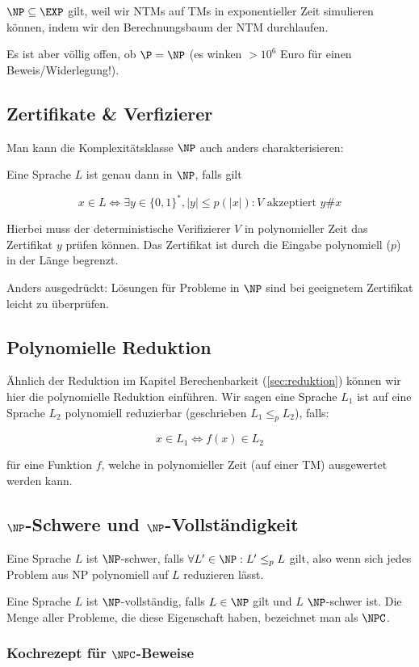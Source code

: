 \documentclass[a4paper,parskip=half*,DIV=7,fontsize=11pt]{scrartcl}
\begin{document}
$\NP \subseteq \EXP$ gilt, weil wir NTMs auf TMs in exponentieller Zeit simulieren können, indem wir den Berechnungsbaum der NTM durchlaufen.

Es ist aber völlig offen, ob $\P = \NP$ (es winken $> 10^6$ Euro für einen Beweis/Widerlegung!).

\subsection{Zertifikate \& Verfizierer}
Man kann die Komplexitätsklasse $\NP$ auch anders charakterisieren:

Eine Sprache $L$ ist genau dann in $\NP$, falls gilt

\[x\in L \iff \exists y\in \{0,1\}^*, |y|\leq p(|x|): \text{$V$ akzeptiert $y\#x$}\]

Hierbei muss der deterministische Verifizierer $V$ in polynomieller Zeit das Zertifikat $y$ prüfen können. Das Zertifikat ist durch die Eingabe polynomiell ($p$) in der Länge begrenzt.

Anders ausgedrückt: Lösungen für Probleme in $\NP$ sind bei geeignetem Zertifikat leicht zu überprüfen. 

\subsection{Polynomielle Reduktion}
Ähnlich der Reduktion im Kapitel Berechenbarkeit (\ref{sec:reduktion}) können wir hier die polynomielle Reduktion einführen. Wir sagen eine Sprache  $L_1$ ist auf eine Sprache $L_2$ polynomiell reduzierbar (geschrieben $L_1 \leq_p L_2$), falls:

\[x \in L_1 \iff f(x) \in L_2\]

für eine Funktion $f$, welche in polynomieller Zeit (auf einer TM) ausgewertet werden kann.

\subsection[NP-Schwere und NP-Vollständigkeit]{$\NP$-Schwere und $\NP$-Vollständigkeit}
Eine Sprache $L$ ist $\NP$-schwer, falls $\forall L' \in \NP : L' \leq_p L$ gilt, also wenn sich jedes Problem aus NP polynomiell auf $L$ reduzieren lässt.

Eine Sprache $L$ ist $\NP$-vollständig, falls $L \in \NP$ gilt und $L$ $\NP$-schwer ist. Die Menge aller Probleme, die diese Eigenschaft haben, bezeichnet man als $\NPC$.

\subsubsection[Kochrezept für NPC-Beweise]{Kochrezept für $\NPC$-Beweise}
\end{document}
